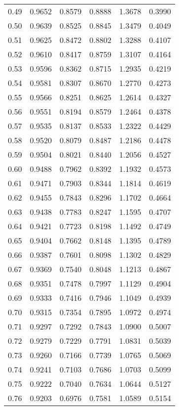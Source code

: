 \documentclass{article}
\begin{document}
\begin{longtable}{cccccc}
0.49 & 0.9652 & 0.8579 & 0.8888 & 1.3678 & 0.3990 \\
0.50 & 0.9639 & 0.8525 & 0.8845 & 1.3479 & 0.4049 \\
0.51 & 0.9625 & 0.8472 & 0.8802 & 1.3288 & 0.4107 \\
0.52 & 0.9610 & 0.8417 & 0.8759 & 1.3107 & 0.4164 \\
0.53 & 0.9596 & 0.8362 & 0.8715 & 1.2935 & 0.4219 \\
0.54 & 0.9581 & 0.8307 & 0.8670 & 1.2770 & 0.4273 \\
0.55 & 0.9566 & 0.8251 & 0.8625 & 1.2614 & 0.4327 \\
0.56 & 0.9551 & 0.8194 & 0.8579 & 1.2464 & 0.4378 \\
0.57 & 0.9535 & 0.8137 & 0.8533 & 1.2322 & 0.4429 \\
0.58 & 0.9520 & 0.8079 & 0.8487 & 1.2186 & 0.4478 \\
0.59 & 0.9504 & 0.8021 & 0.8440 & 1.2056 & 0.4527 \\
0.60 & 0.9488 & 0.7962 & 0.8392 & 1.1932 & 0.4573 \\
0.61 & 0.9471 & 0.7903 & 0.8344 & 1.1814 & 0.4619 \\
0.62 & 0.9455 & 0.7843 & 0.8296 & 1.1702 & 0.4664 \\
0.63 & 0.9438 & 0.7783 & 0.8247 & 1.1595 & 0.4707 \\
0.64 & 0.9421 & 0.7723 & 0.8198 & 1.1492 & 0.4749 \\
0.65 & 0.9404 & 0.7662 & 0.8148 & 1.1395 & 0.4789 \\
0.66 & 0.9387 & 0.7601 & 0.8098 & 1.1302 & 0.4829 \\
0.67 & 0.9369 & 0.7540 & 0.8048 & 1.1213 & 0.4867 \\
0.68 & 0.9351 & 0.7478 & 0.7997 & 1.1129 & 0.4904 \\
0.69 & 0.9333 & 0.7416 & 0.7946 & 1.1049 & 0.4939 \\
0.70 & 0.9315 & 0.7354 & 0.7895 & 1.0972 & 0.4974 \\
0.71 & 0.9297 & 0.7292 & 0.7843 & 1.0900 & 0.5007 \\
0.72 & 0.9279 & 0.7229 & 0.7791 & 1.0831 & 0.5039 \\
0.73 & 0.9260 & 0.7166 & 0.7739 & 1.0765 & 0.5069 \\
0.74 & 0.9241 & 0.7103 & 0.7686 & 1.0703 & 0.5099 \\
0.75 & 0.9222 & 0.7040 & 0.7634 & 1.0644 & 0.5127 \\
0.76 & 0.9203 & 0.6976 & 0.7581 & 1.0589 & 0.5154 \\

\end{longtable}
\end{document}
